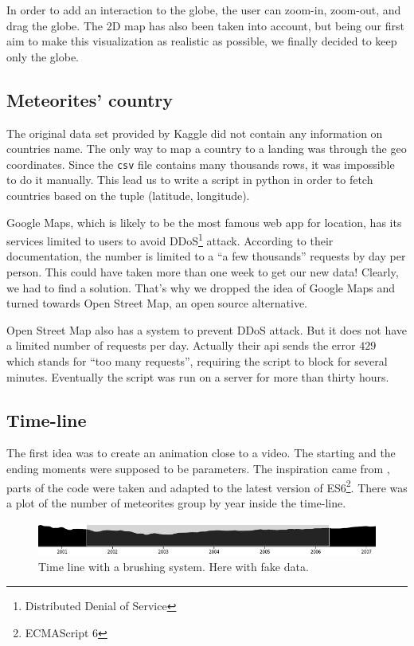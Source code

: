 \documentclass[10pt,conference,compsocconf]{IEEEtran}
\begin{document}
In order to add an interaction to the globe, the user can zoom-in, zoom-out, and drag the globe. 
The 2D map has also been taken into account, but being our first aim to make this visualization as realistic as possible, we finally decided to keep only the globe.

\subsection{Meteorites' country}

The original data set provided by Kaggle did not contain any information on countries name. The only way to map a country to a landing was through the geo coordinates. Since the \texttt{csv} file contains many thousands rows, it was impossible to do it manually. This lead us to write a script in python in order to fetch countries based on the tuple (latitude, longitude).

Google Maps, which is likely to be the most famous web app for location, has its services limited to users to avoid DDoS\footnote{Distributed Denial of Service} attack. According to their documentation, the number is limited to a ``a few thousands'' requests by day per person. This could have taken more than one week to get our new data! Clearly, we had to find a solution. That's why we dropped the idea of Google Maps and turned towards Open Street Map, an open source alternative.

Open Street Map also has a system to prevent DDoS attack. But it does not have a limited number of requests per day. Actually their api sends the error $429$ which stands for ``too many requests'', requiring the script to block for several minutes. Eventually the script was run on a server for more than thirty hours.

\subsection{Time-line}

The first idea was to create an animation close to a video. The starting and the ending moments were supposed to be parameters. The inspiration came from \cite{ocks_brush_and_zoom}, parts of the code were taken and adapted to the latest version of ES6\footnote{ECMAScript 6}. There was a plot of the number of meteorites group by year inside the time-line.

\begin{figure}[H]
  \centering
  \includegraphics[width=\columnwidth]{images/timeline_brush.png}
  \vspace{-3mm}
  \caption{Time line with a brushing system. Here with fake data.}
  \label{fig:timeline_brush}
\end{figure}
\end{document}
